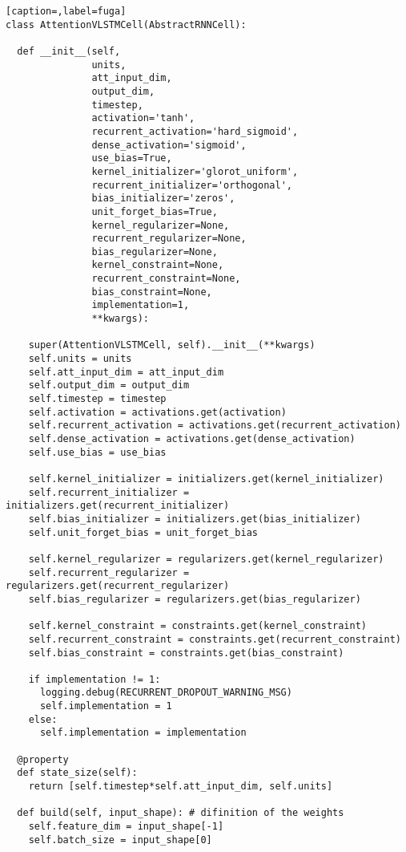 \begin{lstlisting}[caption=,label=fuga]
class AttentionVLSTMCell(AbstractRNNCell):

  def __init__(self,
               units,
               att_input_dim,
               output_dim,
               timestep,
               activation='tanh',
               recurrent_activation='hard_sigmoid',
               dense_activation='sigmoid',
               use_bias=True,
               kernel_initializer='glorot_uniform',
               recurrent_initializer='orthogonal',
               bias_initializer='zeros',
               unit_forget_bias=True,
               kernel_regularizer=None,
               recurrent_regularizer=None,
               bias_regularizer=None,
               kernel_constraint=None,
               recurrent_constraint=None,
               bias_constraint=None,
               implementation=1,
               **kwargs):

    super(AttentionVLSTMCell, self).__init__(**kwargs)
    self.units = units
    self.att_input_dim = att_input_dim
    self.output_dim = output_dim
    self.timestep = timestep
    self.activation = activations.get(activation)
    self.recurrent_activation = activations.get(recurrent_activation)
    self.dense_activation = activations.get(dense_activation)
    self.use_bias = use_bias

    self.kernel_initializer = initializers.get(kernel_initializer)
    self.recurrent_initializer = initializers.get(recurrent_initializer)
    self.bias_initializer = initializers.get(bias_initializer)
    self.unit_forget_bias = unit_forget_bias

    self.kernel_regularizer = regularizers.get(kernel_regularizer)
    self.recurrent_regularizer = regularizers.get(recurrent_regularizer)
    self.bias_regularizer = regularizers.get(bias_regularizer)

    self.kernel_constraint = constraints.get(kernel_constraint)
    self.recurrent_constraint = constraints.get(recurrent_constraint)
    self.bias_constraint = constraints.get(bias_constraint)

    if implementation != 1:
      logging.debug(RECURRENT_DROPOUT_WARNING_MSG)
      self.implementation = 1
    else:
      self.implementation = implementation

  @property
  def state_size(self):
    return [self.timestep*self.att_input_dim, self.units]

  def build(self, input_shape): # difinition of the weights
    self.feature_dim = input_shape[-1]
    self.batch_size = input_shape[0]


\end{lstlisting}
